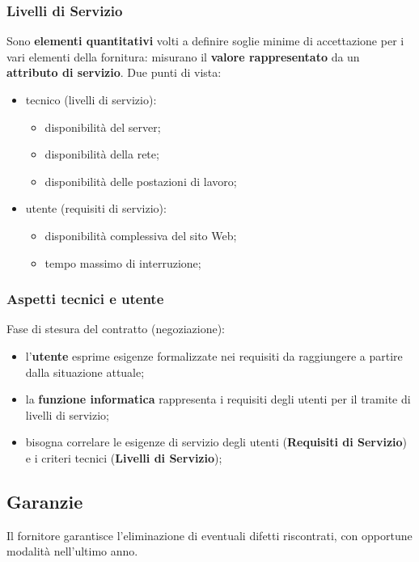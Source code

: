 \documentclass{article}
\begin{document}
\subsubsection{Livelli di Servizio}\label{sub:livelli_di_servizio} %
Sono \textbf{elementi quantitativi} volti a definire soglie minime di accettazione per i vari elementi della fornitura: misurano il \textbf{valore rappresentato} da un \textbf{attributo di servizio}.
Due punti di vista:
\begin{itemize}
    \item tecnico (livelli di servizio):
        \begin{itemize}
            \item disponibilità del server;
            \item disponibilità della rete;
            \item disponibilità delle postazioni di lavoro;
        \end{itemize}
    \item utente (requisiti di servizio):
        \begin{itemize}
            \item disponibilità complessiva del sito Web;
            \item tempo massimo di interruzione;
        \end{itemize}
\end{itemize}
%
\subsubsection{Aspetti tecnici e utente}\label{sub:aspetti_tecnici_e_utente} %
Fase di stesura del contratto (negoziazione):
\begin{itemize}
    \item l'\textbf{utente} esprime esigenze formalizzate nei requisiti da raggiungere a partire dalla situazione attuale;
    \item la \textbf{funzione informatica} rappresenta i requisiti degli utenti per il tramite di livelli di servizio;
    \item bisogna correlare le esigenze di servizio degli utenti (\textbf{Requisiti di Servizio}) e i criteri tecnici (\textbf{Livelli di Servizio});
\end{itemize}
%
\subsection{Garanzie}\label{sub:garanzie} %
Il fornitore garantisce l'eliminazione di eventuali difetti riscontrati, con opportune modalità nell'ultimo anno.
%
\end{document}
